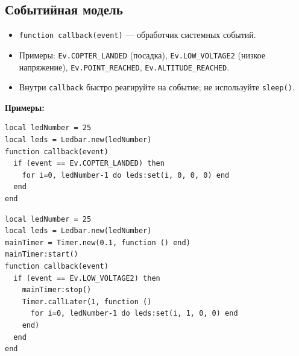 \subsection{Событийная модель}
\begin{itemize}
  \item \verb|function callback(event)| — обработчик системных событий.
  \item Примеры: \verb|Ev.COPTER_LANDED| (посадка), \verb|Ev.LOW_VOLTAGE2| (низкое напряжение), \verb|Ev.POINT_REACHED|, \verb|Ev.ALTITUDE_REACHED|.
  \item Внутри \verb|callback| быстро реагируйте на событие; не используйте \verb|sleep()|.
\end{itemize}
\textbf{Примеры:}
\begin{verbatim}
local ledNumber = 25
local leds = Ledbar.new(ledNumber)
function callback(event)
  if (event == Ev.COPTER_LANDED) then
    for i=0, ledNumber-1 do leds:set(i, 0, 0, 0) end
  end
end
\end{verbatim}
\begin{verbatim}
local ledNumber = 25
local leds = Ledbar.new(ledNumber)
mainTimer = Timer.new(0.1, function () end)
mainTimer:start()
function callback(event)
  if (event == Ev.LOW_VOLTAGE2) then
    mainTimer:stop()
    Timer.callLater(1, function ()
      for i=0, ledNumber-1 do leds:set(i, 1, 0, 0) end
    end)
  end
end
\end{verbatim}
